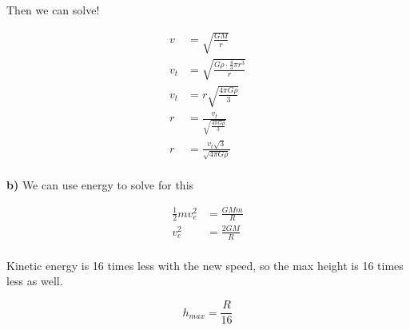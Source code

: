 \documentclass{article}
\begin{document}
Then we can solve!

\begin{align*}
    v &= \sqrt{\frac{GM}{r}} \\
    v_t &= \sqrt{\frac{G\rho\cdot\frac{4}{3}\pi r^3}{r}} \\
    v_t &= r \sqrt{\frac{4\pi G\rho}{3}} \\
    r &= \frac{v_t}{\sqrt{\frac{4\pi G\rho}{3}}} \\
    r &= \frac{v_t\sqrt{3}}{\sqrt{4\pi G\rho}} \\
\end{align*}

\vspace{1cm}
\textbf{b)} We can use energy to solve for this

\begin{align*}
    \frac{1}{2}mv_e^2 &= \frac{GMm}{R} \\
    v_e^2 &= \frac{2GM}{R} \\
\end{align*}

Kinetic energy is 16 times less with the new speed, so the max height is 16 times less as well.

$$
h_{max} = \frac{R}{16}
$$
\end{document}
